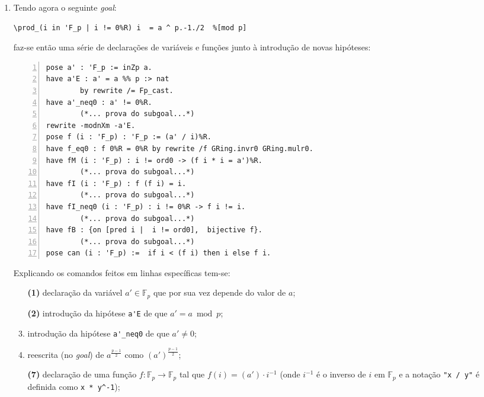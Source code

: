 \begin{enumerate}[label=\textbf{\roman*.}]
        \item Tendo agora o seguinte \textit{goal}:
        \begin{lstlisting}[language=coq,frame=single,tabsize=1]
\prod_(i in 'F_p | i != 0%R) i  = a ^ p.-1./2  %[mod p]
        \end{lstlisting}
        faz-se então uma série de declarações de variáveis e funções junto à introdução de novas hipóteses:
        \begin{lstlisting}[language=coq,frame=single, numbers=left,stepnumber=1,tabsize=1]
pose a' : 'F_p := inZp a.
have a'E : a' = a %% p :> nat
        by rewrite /= Fp_cast.
have a'_neq0 : a' != 0%R.
        (*... prova do subgoal...*)
rewrite -modnXm -a'E.
pose f (i : 'F_p) : 'F_p := (a' / i)%R. 
have f_eq0 : f 0%R = 0%R by rewrite /f GRing.invr0 GRing.mulr0. 
have fM (i : 'F_p) : i != ord0 -> (f i * i = a')%R. 
        (*... prova do subgoal...*)
have fI (i : 'F_p) : f (f i) = i.
        (*... prova do subgoal...*)
have fI_neq0 (i : 'F_p) : i != 0%R -> f i != i.
        (*... prova do subgoal...*)
have fB : {on [pred i |  i != ord0],  bijective f}.
        (*... prova do subgoal...*)
pose can (i : 'F_p) :=  if i < (f i) then i else f i.
        \end{lstlisting}
        Explicando os comandos feitos em linhas específicas tem-se:
        \begin{enumerate}
                \item[\textbf{(1)}] declaração da variável $a' \in \mathbb{F}_p$ que por sua vez depende do valor de $a$;
                
                \item[\textbf{(2)}] introdução da hipótese \lstinline[language=coq]|a'E| de que $a' = a \bmod{p}$; 
                
                \item[\textbf{(4)}] introdução da hipótese \lstinline[language=coq]|a'_neq0| de que $a' \neq 0$;
                
                \item[\textbf{(6)}] reescrita (no \textit{goal}) de $a^{\frac{p-1}{2}}$ como $(a')^{\frac{p-1}{2}}$;
                
                \item[\textbf{(7)}] declaração de uma função $f : \mathbb{F}_p \rightarrow \mathbb{F}_p$ tal que $f(i) = (a') \cdot i^{-1}$ (onde $i^{-1}$ é o inverso de $i$ em $\mathbb{F}_p$ e a notação \lstinline[language=coq]|"x / y"| é definida como \lstinline[language=coq]|x * y^-1|);
                

\end{enumerate}
\end{enumerate}
